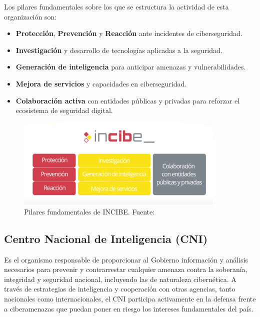\documentclass[a4paper, 10pt]{article}
\begin{document}
\par\vspace{0.5cm}

Los pilares fundamentales sobre los que se estructura la actividad de esta organización son:
\begin{itemize}
\item \textbf{Protección}, \textbf{Prevención} y \textbf{Reacción} ante incidentes de ciberseguridad.
\item \textbf{Investigación} y desarrollo de tecnologías aplicadas a la seguridad.
\item \textbf{Generación de inteligencia} para anticipar amenazas y vulnerabilidades.
\item \textbf{Mejora de servicios} y capacidades en ciberseguridad.
\item \textbf{Colaboración activa} con entidades públicas y privadas para reforzar el ecosistema de seguridad digital.
\end{itemize}

\begin{figure}[H]
\centering
\includegraphics[width=10cm]{images/incibe.png}
\caption{Pilares fundamentales de INCIBE. Fuente:\cite{incibe}}
\label{fig:incibe-pilares}
\end{figure}

\par\vspace{0.5cm}
\subsection*{Centro Nacional de Inteligencia (CNI)}

Es el organismo responsable de proporcionar al Gobierno información y análisis necesarios para prevenir y contrarrestar cualquier amenaza contra la soberanía, integridad y seguridad nacional, incluyendo las de naturaleza cibernética. A través de estrategias de inteligencia y cooperación con otras agencias, tanto nacionales como internacionales, el CNI participa activamente en la defensa frente a ciberamenazas que puedan poner en riesgo los intereses fundamentales del país. \cite{cni}
\par\vspace{0.5cm}
\end{document}
